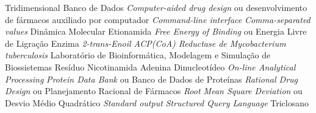 \documentclass[portuguese,twoside]{pucrs-ppgcc}
\begin{document}
		{Tridimensional}
		{Banco de Dados}
	{\emph{Computer-aided drug design} ou desenvolvimento de fármacos auxiliado por computador}
 	{\emph{Command-line interface}}
 	{\emph{Comma-separated values}}
		{Dinâmica Molecular}
		{Etionamida}
		{\emph{Free Energy of Binding} ou Energia Livre de Ligração}
	{Enzima \emph{2-trans-Enoil ACP(CoA) Reductase de Mycobacterium tuberculosis}}
	{Laboratório de Bioinformática, Modelagem e Simulação de Biossistemas}
	{Resíduo Nicotinamida Adenina Dinucleotídeo}
 	{\emph{On-line Analytical Processing}}
		{\emph{Protein Data Bank} ou Banco de Dados de Proteínas}
		{\emph{Rational Drug Design} ou Planejamento Racional de Fármacos}
	{\emph{Root Mean Square Deviation} ou Desvio Médio Quadrático}
 	{\emph{Standard output}}
 	{\emph{Structured Query Language}}
 	{Triclosano}











%


\end{document}
